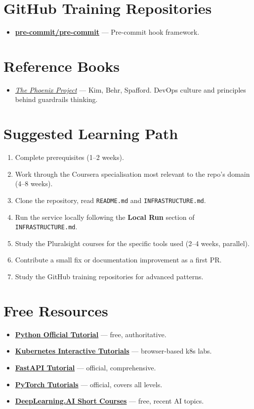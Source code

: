 \documentclass[11pt,a4paper]{article}
\begin{document}
\section{GitHub Training Repositories}
\begin{itemize}[leftmargin=1.5em]
  \item \href{https://github.com/pre-commit/pre-commit}{\textbf{pre-commit/pre-commit}} — Pre-commit hook framework.
\end{itemize}

\section{Reference Books}
\begin{itemize}[leftmargin=1.5em]
  \item \href{https://itrevolution.com/product/the-phoenix-project/}{\textit{The Phoenix Project}} — Kim, Behr, Spafford. DevOps culture and principles behind guardrails thinking.
\end{itemize}

\section{Suggested Learning Path}
\begin{enumerate}
  \item Complete prerequisites (1--2 weeks).
  \item Work through the Coursera specialisation most relevant to the repo's domain (4--8 weeks).
  \item Clone the repository, read \texttt{README.md} and \texttt{INFRASTRUCTURE.md}.
  \item Run the service locally following the \textbf{Local Run} section of \texttt{INFRASTRUCTURE.md}.
  \item Study the Pluralsight courses for the specific tools used (2--4 weeks, parallel).
  \item Contribute a small fix or documentation improvement as a first PR.
  \item Study the GitHub training repositories for advanced patterns.
\end{enumerate}

\section{Free Resources}
\begin{itemize}
  \item \href{https://docs.python.org/3/tutorial/}{\textbf{Python Official Tutorial}} — free, authoritative.
  \item \href{https://kubernetes.io/docs/tutorials/}{\textbf{Kubernetes Interactive Tutorials}} — browser-based k8s labs.
  \item \href{https://fastapi.tiangolo.com/tutorial/}{\textbf{FastAPI Tutorial}} — official, comprehensive.
  \item \href{https://pytorch.org/tutorials/}{\textbf{PyTorch Tutorials}} — official, covers all levels.
  \item \href{https://www.deeplearning.ai/short-courses/}{\textbf{DeepLearning.AI Short Courses}} — free, recent AI topics.
\end{itemize}
\end{document}
